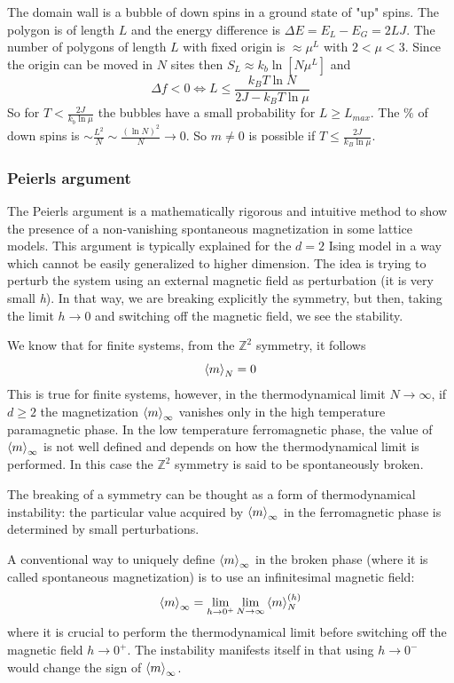\documentclass[../../Main/Main.tex]{subfiles}
\begin{document}
The domain wall is a bubble of down spins in a ground state of "up" spins. The polygon is of length $L$ and the energy difference is $\Delta E = E_{L} - E_{G} = 2LJ$. The number of polygons of length $L$ with fixed origin is $\approx \mu^{L}$ with $2 < \mu < 3$. Since the origin can be moved in $N$ sites then $S_{L} \approx k_{b}\ln[N \mu^{L}]$ and
$$\Delta f < 0 \Leftrightarrow L \leq \frac{k_{B}T\ln N}{2J - k_{B}T\ln \mu}$$
So for $T < \frac{2J}{k_{b}\ln \mu}$ the bubbles have a small probability for $L \geq L_{max}$. The $\%$ of down spins is $\sim \frac{L^{2}}{N} \sim \frac{(\ln N)^{2}}{N} \to 0$. So $m \neq 0$ is possible if $T \leq \frac{2J}{k_{B}\ln \mu}$.




\subsubsection*{Peierls argument}
The Peierls argument \cite{10_lesson_1} is a mathematically rigorous and intuitive method to show the presence of a non-vanishing spontaneous magnetization in some lattice models. This argument is typically explained for the \(d=2\) Ising model in a way which cannot be easily generalized to higher dimension.
The idea is trying to perturb the system using an external magnetic field as perturbation (it is very small \emph{h}). In that way, we are breaking explicitly the symmetry, but then, taking the limit \( h \rightarrow 0 \) and switching off the magnetic field, we see the stability.

 We know that for finite systems, from the \( \mathbb{Z}^2 \) symmetry, it follows
\begin{equation*}
  \expval{m}_N = 0
\end{equation*}
This is true for finite systems, however, in the thermodynamical limit \( N \rightarrow \infty  \), if \(d \ge 2\) the magnetization \( \expval{m}_{\infty } \) vanishes only in the high temperature paramagnetic phase. 
In the low temperature ferromagnetic phase, the value of \( \expval{m}_{\infty } \) is not well defined and depends on how the thermodynamical limit is performed. In this case the \( \mathbb{Z}^2\) symmetry  is said to be spontaneously broken.

The breaking of a symmetry can be thought as a form of thermodynamical instability: the particular value acquired by \( \expval{m}_{\infty } \) in the ferromagnetic phase is determined by small perturbations.

A conventional way to uniquely define \( \expval{m}_{\infty } \) in the broken phase (where it is called spontaneous magnetization) is to use an infinitesimal magnetic field:
\begin{equation}
  \expval{m}_{\infty } = \lim_{h \rightarrow 0^+} \lim_{N \rightarrow \infty } \expval{m}_N^{(h)}
\end{equation}
where it is crucial to perform the thermodynamical limit before switching off the magnetic field \( h \rightarrow 0^+ \). The instability manifests itself in that using \( h \rightarrow 0^- \)  would change the sign of \( \expval{m}_{\infty } \).
\end{document}
